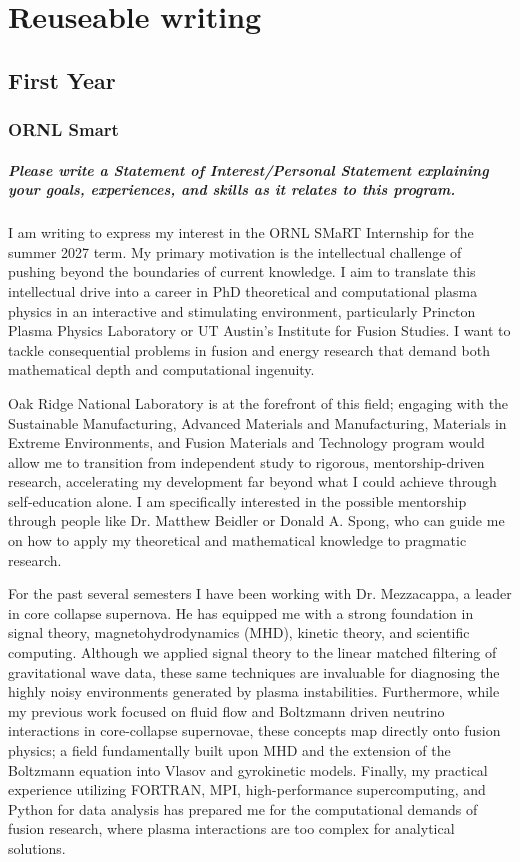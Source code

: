 \chapter{Reuseable writing}
\section{First Year}

\subsection{ORNL Smart}
\paragraph{Please write a Statement of Interest/Personal Statement explaining your goals, experiences, and skills as it relates to this program.}
I am writing to express my interest in the ORNL SMaRT Internship for the summer 2027 term. My primary motivation is the intellectual challenge of pushing beyond the boundaries of current knowledge. I aim to translate this intellectual drive into a career in PhD theoretical and computational plasma physics in an interactive and stimulating environment, particularly Princton Plasma Physics Laboratory or UT Austin’s Institute for Fusion Studies. I want to tackle consequential problems in fusion and energy research that demand both mathematical depth and computational ingenuity.



Oak Ridge National Laboratory is at the forefront of this field; engaging with the Sustainable Manufacturing, Advanced Materials and Manufacturing, Materials in Extreme Environments, and Fusion Materials and Technology program would allow me to transition from independent study to rigorous, mentorship-driven research, accelerating my development far beyond what I could achieve through self-education alone. I am specifically interested in the possible mentorship through people like Dr. Matthew Beidler or Donald A. Spong, who can guide me on how to apply my theoretical and mathematical knowledge to pragmatic research.



For the past several semesters I have been working with Dr. Mezzacappa, a leader in core collapse supernova. He has equipped me with a strong foundation in signal theory, magnetohydrodynamics (MHD), kinetic theory, and scientific computing. Although we applied signal theory to the linear matched filtering of gravitational wave data, these same techniques are invaluable for diagnosing the highly noisy environments generated by plasma instabilities. Furthermore, while my previous work focused on fluid flow and Boltzmann driven neutrino interactions in core-collapse supernovae, these concepts map directly onto fusion physics; a field fundamentally built upon MHD and the extension of the Boltzmann equation into Vlasov and gyrokinetic models. Finally, my practical experience utilizing FORTRAN, MPI, high-performance supercomputing, and Python for data analysis has prepared me for the computational demands of fusion research, where plasma interactions are too complex for analytical solutions.



